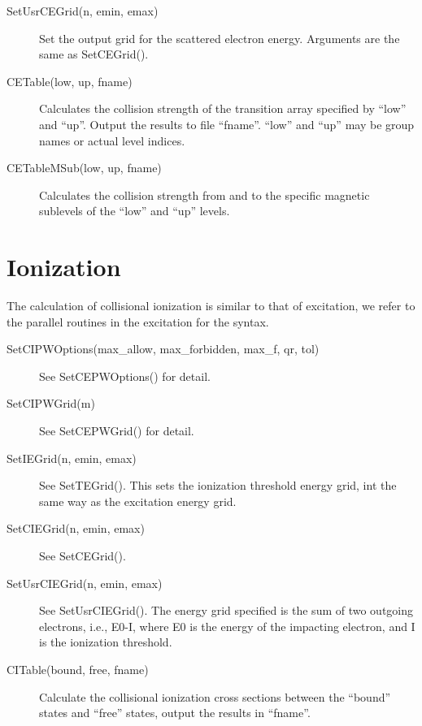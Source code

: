 \documentclass[12pt]{article}
\begin{document}
\begin{description}
\item[SetUsrCEGrid(n, emin, emax)]
Set the output grid for the scattered electron energy. Arguments are the same
as SetCEGrid().

\item[CETable(low, up, fname)] Calculates the collision strength of the
transition array specified by ``low'' and ``up''. Output the results to file
``fname''. ``low'' and ``up'' may be group names or actual level indices.

\item[CETableMSub(low, up, fname)] Calculates the collision strength from and
to the specific magnetic sublevels of the ``low'' and ``up'' levels.

\end{description}

\section{Ionization}
The calculation of collisional ionization is similar to that of excitation, we
refer to the parallel routines in the excitation for the syntax.
\begin{description}
\item[SetCIPWOptions(max\_allow, max\_forbidden, max\_f, qr, tol)] 
See SetCEPWOptions() for detail.

\item[SetCIPWGrid(m)]
See SetCEPWGrid() for detail.

\item[SetIEGrid(n, emin, emax)]
See SetTEGrid(). This sets the ionization threshold energy grid, int the same
way as the excitation energy grid.

\item[SetCIEGrid(n, emin, emax)]
See SetCEGrid().

\item[SetUsrCIEGrid(n, emin, emax)]
See SetUsrCIEGrid(). The energy grid specified is the sum of two outgoing
electrons, i.e., E0-I, where E0 is the energy of the impacting electron, and I
is the ionization threshold.

\item[CITable(bound, free, fname)] 
Calculate the collisional ionization cross sections between the ``bound''
states and ``free'' states, output the results in ``fname''.
\end{description}
\end{document}
